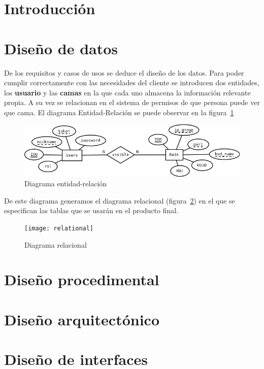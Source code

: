 
\section{Introducción}

\section{Diseño de datos}

De los requisitos y casos de usos se deduce el diseño de los datos. Para poder cumplir correctamente con las necesidades del cliente se introducen dos entidades, los \textbf{usuario} y las \textbf{camas} en la que cada uno almacena la información relevante propia. A su vez se relacionan en el sistema de permisos de que persona puede ver que cama. El diagrama Entidad-Relación se puede observar en la figura~\ref{fig:erDia}

\begin{figure}
	\centering
	\includegraphics[width=\textwidth]{img/entidad-relacion.png}
	\caption{Diagrama entidad-relación}
	\label{fig:erDia}
\end{figure}

De este diagrama generamos el diagrama relacional (figura~\ref{fig:relational}) en el que se especifican las tablas que se usarán en el producto final.

\begin{figure}
	\centering
	\texttt{[image: relational]}
	\caption{Diagrama relacional}
	\label{fig:relational}
\end{figure}


\section{Diseño procedimental}

\section{Diseño arquitectónico}

\section{Diseño de interfaces}

